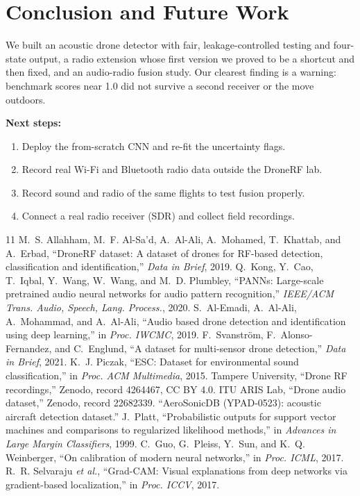 \documentclass[conference,a4paper]{IEEEtran}
\begin{document}
\section{Conclusion and Future Work}
We built an acoustic drone detector with fair, leakage-controlled testing and four-state output,
a radio extension whose first version we proved to be a shortcut and then fixed, and an audio-radio
fusion study. Our clearest finding is a warning: benchmark scores near 1.0 did not survive a second
receiver or the move outdoors.

\textbf{Next steps:}
\begin{enumerate}
  \item Deploy the from-scratch CNN and re-fit the uncertainty flags.
  \item Record real Wi-Fi and Bluetooth radio data outside the DroneRF lab.
  \item Record sound and radio of the same flights to test fusion properly.
  \item Connect a real radio receiver (SDR) and collect field recordings.
\end{enumerate}

\begin{thebibliography}{11}
 M.~S. Allahham, M.~F. Al-Sa'd, A.~Al-Ali, A.~Mohamed, T.~Khattab, and A.~Erbad, ``DroneRF dataset: A dataset of drones for RF-based detection, classification and identification,'' \emph{Data in Brief}, 2019.
 Q.~Kong, Y.~Cao, T.~Iqbal, Y.~Wang, W.~Wang, and M.~D. Plumbley, ``PANNs: Large-scale pretrained audio neural networks for audio pattern recognition,'' \emph{IEEE/ACM Trans. Audio, Speech, Lang. Process.}, 2020.
 S.~Al-Emadi, A.~Al-Ali, A.~Mohammad, and A.~Al-Ali, ``Audio based drone detection and identification using deep learning,'' in \emph{Proc. IWCMC}, 2019.
 F.~Svanstr\"om, F.~Alonso-Fernandez, and C.~Englund, ``A dataset for multi-sensor drone detection,'' \emph{Data in Brief}, 2021.
 K.~J. Piczak, ``ESC: Dataset for environmental sound classification,'' in \emph{Proc. ACM Multimedia}, 2015.
 Tampere University, ``Drone RF recordings,'' Zenodo, record 4264467, CC BY 4.0.
 ITU ARIS Lab, ``Drone audio dataset,'' Zenodo, record 22682339.
 ``AeroSonicDB (YPAD-0523): acoustic aircraft detection dataset.''
 J.~Platt, ``Probabilistic outputs for support vector machines and comparisons to regularized likelihood methods,'' in \emph{Advances in Large Margin Classifiers}, 1999.
 C.~Guo, G.~Pleiss, Y.~Sun, and K.~Q. Weinberger, ``On calibration of modern neural networks,'' in \emph{Proc. ICML}, 2017.
 R.~R. Selvaraju \emph{et al.}, ``Grad-CAM: Visual explanations from deep networks via gradient-based localization,'' in \emph{Proc. ICCV}, 2017.
\end{thebibliography}
\end{document}
